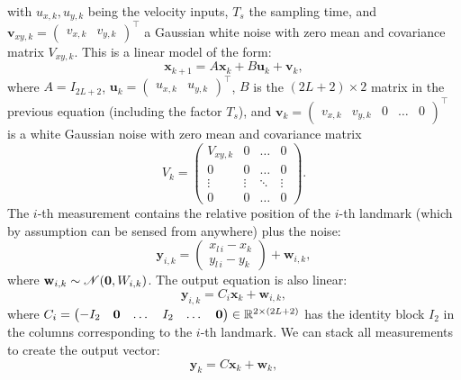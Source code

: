 \documentclass[10pt, a4paper]{report}
\begin{document}
with $ u_{x,k},u_{y,k}$ being the velocity inputs, $T_s$ the sampling time, and $\mathbf v_{xy,k}=\begin{pmatrix}
     v_{x,k} & v_{y,k}
\end{pmatrix}^\top$ a Gaussian white noise with zero 
mean and covariance matrix $V_{xy,k}$. This is a linear model of the form:\begin{equation}
    \mathbf x_{k+1}=A\mathbf x_k+B\mathbf u_k+\mathbf v_k,
\end{equation}
where $A=I_{2L+2}$, $\mathbf u_{k}=\begin{pmatrix}
     u_{x,k} & u_{y,k}
\end{pmatrix}^\top$, $B$ is the $(2L+2)\times 2$ matrix in the previous equation (including the factor $T_s$), and $
    \mathbf v_k=\begin{pmatrix}
        v_{x,k}&v_{y,k}&0&\dots &0
    \end{pmatrix}^\top$
is a white Gaussian noise with zero mean and covariance matrix\begin{equation}
    V_k=\begin{pmatrix}
        V_{xy,k} & 0 &\dots & 0\\ 
        0& 0 & \dots & 0\\ 
        \vdots & \vdots & \ddots & \vdots \\ 
        0& 0 & \dots & 0
    \end{pmatrix}.
\end{equation}
The $i$-th measurement contains the relative position of the $i$-th landmark (which by assumption can be sensed from anywhere) plus the noise:\begin{equation}
    \mathbf y_{i,k}=\begin{pmatrix}
        x_{l\, i}-x_{k}\\ y_{l\, i}-y_{k}
    \end{pmatrix}+\mathbf w_{i,k},
\end{equation}
where $\mathbf w_{i,k}\sim\mathscr{N}(\mathbf 0,W_{i,k})$. The output equation is also linear:\begin{equation}
    \mathbf y_{i,k}=C_i\mathbf x_k+\mathbf w_{i,k},
\end{equation}
where $C_i=\begin{pmatrix}-I_2&\mathbf 0&\dots&I_2&\dots&\mathbf 0\end{pmatrix}\in{\mathbb R}^{2\times(2L+2)}$ has the identity block $I_2$ in the columns corresponding to the $i$-th landmark. We can stack all measurements to create the output vector:\begin{equation}
    \mathbf y_k=C\mathbf x_k+\mathbf w_k,
\end{equation}
\end{document}
